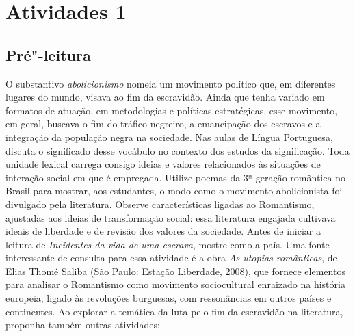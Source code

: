 \documentclass[12pt]{extarticle}
\begin{document}
\tableofcontents


\section{Atividades 1}


\subsection{Pré"-leitura}

\bnccativividadespreleitura

O substantivo \emph{abolicionismo} nomeia um movimento
político que, em diferentes lugares do mundo, visava ao fim da
escravidão. Ainda que tenha variado em formatos de atuação, em
metodologias e políticas estratégicas, esse movimento, em geral, buscava
o fim do tráfico negreiro, a emancipação dos escravos e a integração da
população negra na sociedade. Nas aulas de Língua Portuguesa, discuta o
significado desse vocábulo no contexto dos estudos da significação. Toda
unidade lexical carrega consigo ideias e valores relacionados às
situações de interação social em que é empregada. Utilize poemas da 3ª
geração romântica no Brasil para mostrar, aos estudantes, o modo como o
movimento abolicionista foi divulgado pela literatura. Observe
características ligadas ao Romantismo, ajustadas aos ideias de
transformação social: essa literatura engajada cultivava ideais de
liberdade e de revisão dos valores da sociedade. Antes de iniciar a
leitura de \emph{Incidentes da vida de uma escrava}, mostre como a
país. Uma fonte interessante de consulta para essa atividade é a obra
\emph{As utopias românticas}, de Elias Thomé Saliba (São Paulo: Estação
Liberdade, 2008), que fornece elementos para analisar o Romantismo como
movimento sociocultural enraizado na história europeia, ligado às
revoluções burguesas, com ressonâncias em outros países e continentes.
Ao explorar a temática da luta pelo fim da escravidão na literatura,
proponha também outras atividades:
\end{document}
